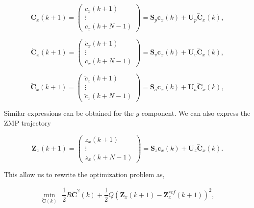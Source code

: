 \begin{equation}
 \label{Eq:PosCMHorizon}
 {\mathbf C}_x(k+1) = \left(
 \begin{matrix}
  c_x(k+1) \\
  \vdots \\
  c_x(k+N-1)
 \end{matrix}
 \right) = {\mathbf S}_p {\mathbf c}_x(k) + {\mathbf U}_p \dddot{\mathbf C}_x(k),
\end{equation}

\begin{equation}
 \label{Eq:PosCMHorizon}
 \dot{\mathbf C}_x(k+1) = \left(
 \begin{matrix}
  \dot{c}_x(k+1) \\
  \vdots \\
  \dot{c}_x(k+N-1)
 \end{matrix}
 \right) = {\mathbf S}_v {\mathbf c}_x(k) + {\mathbf U}_v \dddot{\mathbf C}_x(k),
\end{equation}

\begin{equation}
 \label{Eq:PosCMHorizon}
 \ddot{\mathbf C}_x(k+1) = \left(
 \begin{matrix}
  \ddot{c}_x(k+1) \\
  \vdots \\
  \ddot{c}_x(k+N-1)
 \end{matrix}
 \right) = {\mathbf S}_a {\mathbf c}_x(k) + {\mathbf U}_a \dddot{\mathbf C}_x(k),
\end{equation}

Similar expressions can be obtained for the $y$ component. We can also express the ZMP trajectory

\begin{equation}
 \label{Eq:PosCMHorizon}
 {\mathbf Z}_x(k+1) = \left(
 \begin{matrix}
  {z}_x(k+1) \\
  \vdots \\
  {z}_x(k+N-1)
 \end{matrix}
 \right) = {\mathbf S}_z {\mathbf c}_x(k) + {\mathbf U}_z \dddot{\mathbf C}_x(k).
\end{equation} 

This allow us to rewrite the optimization problem as,

\begin{eqnarray}
\nonumber
\underset{\dddot{\mathbf{C}}(k)}{\min} ~~ \dfrac{1}{2} R \dddot{\mathbf{C}}^2(k) + \dfrac{1}{2} Q (\mathbf{Z}_x(k+1) - \mathbf{Z}^{ref}_x(k+1))^2,
\label{Eq:MinJerk}
\end{eqnarray}
 
